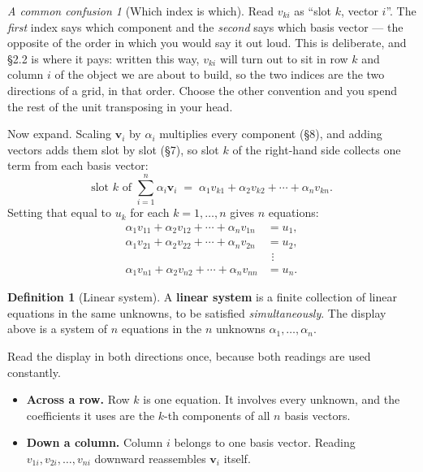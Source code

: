 \documentclass[11pt]{article}
\theoremstyle{plain}
\theoremstyle{definition}
\newtheorem{defn}{Definition}[section]
\theoremstyle{remark}
\newtheorem*{warn}{A common confusion}
\newcommand{\vc}[1]{\mathbf{#1}}        %
\begin{document}
\begin{warn}[Which index is which]
Read $v_{ki}$ as ``slot $k$, vector $i$''. The \emph{first} index says which
component and the \emph{second} says which basis vector --- the opposite of the
order in which you would say it out loud. This is deliberate, and \S2.2 is where
it pays: written this way, $v_{ki}$ will turn out to sit in row $k$ and column
$i$ of the object we are about to build, so the two indices are the two
directions of a grid, in that order. Choose the other convention and you spend
the rest of the unit transposing in your head.
\end{warn}

\noindent Now expand. Scaling $\vc{v}_i$ by $\alpha_i$ multiplies every
component (\S8), and adding vectors adds them slot by slot (\S7), so slot $k$ of
the right-hand side collects one term from each basis vector:
\[
  \text{slot } k \text{ of } \sum_{i=1}^{n}\alpha_i\vc{v}_i
  \;=\; \alpha_1 v_{k1} + \alpha_2 v_{k2} + \cdots + \alpha_n v_{kn} .
\]
Setting that equal to $u_k$ for each $k=1,\dots,n$ gives $n$ equations:
\[
  \begin{aligned}
    \alpha_1 v_{11} + \alpha_2 v_{12} + \cdots + \alpha_n v_{1n} &= u_1 ,\\
    \alpha_1 v_{21} + \alpha_2 v_{22} + \cdots + \alpha_n v_{2n} &= u_2 ,\\
    &\ \,\vdots \\
    \alpha_1 v_{n1} + \alpha_2 v_{n2} + \cdots + \alpha_n v_{nn} &= u_n .
  \end{aligned}
\]

\begin{defn}[Linear system]
A \textbf{linear system} is a finite collection of linear equations in the same
unknowns, to be satisfied \emph{simultaneously}. The display above is a system
of $n$ equations in the $n$ unknowns $\alpha_1,\dots,\alpha_n$.
\end{defn}

\noindent Read the display in both directions once, because both readings are
used constantly.

\begin{itemize}[leftmargin=1.4em,itemsep=4pt]
  \item \textbf{Across a row.} Row $k$ is one equation. It involves every
        unknown, and the coefficients it uses are the $k$-th components of all
        $n$ basis vectors.
  \item \textbf{Down a column.} Column $i$ belongs to one basis vector. Reading
        $v_{1i},v_{2i},\dots,v_{ni}$ downward reassembles $\vc{v}_i$ itself.
\end{itemize}
\end{document}
